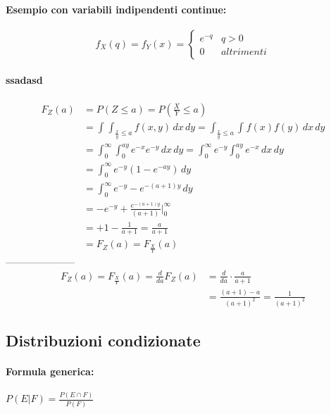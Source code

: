\documentclass[]{article}
\newcommand{\formula}{\paragraph{Formula generica:}}
\begin{document}
    \paragraph{Esempio con variabili indipendenti continue:}
    \begin{equation*}
        f_X(q) = f_Y(x) =
        \begin{cases}
            e^{-q} & q > 0 \\
            0 & altrimenti
        \end{cases}
    \end{equation*}

    \paragraph[short]{ssadasd}
    \begin{equation*}
    \begin{split}
        F_Z(a) & = P(Z \leq a) = P(\frac{X}{Y} \leq a) \\
        & = \int_{}^{} \int_{\frac{x}{y} \leq a}^{} f(x,y) \, dx \, dy = \int_{\frac{x}{y} \leq a}^{}\int_{}^{} f(x) f(y) \, dx \, dy \\ 
        & = \int_{0}^{\infty} \int_{0}^{ay} e^{-x} e^{-y} \, dx \, dy = \int_{0}^{\infty} e^{-y} \int_{0}^{ay} e^{-x} \, dx \, dy \\ 
        & = \int_{0}^{\infty} e^{-y}(1-e^{-ay}) \, dy \\
        & = \int_{0}^{\infty} e^{-y} -e^{-(a+1)y} \, dy \\ 
        & = -e^{-y} + \frac{e^{-(a+1)y}}{(a+1)} \bigg\rvert_{0}^{\infty} \\ 
        & = + 1 - \frac{1}{a+1} = \frac{a}{a+1} \\
        & = F_Z(a) = F_\frac{X}{Y}(a)
    \end{split}
    \end{equation*}
    ---------------------
    \begin{equation*}
    \begin{split}
        F_Z(a) = F_{\frac{X}{Y}}(a) = \frac{d}{da} F_Z(a) & = \frac{d}{da} \cdot \frac{a}{a+1} \\ 
        & = \frac{(a+1) - a}{(a+1)^2} = \frac{1}{(a+1)^2} 
    \end{split}
    \end{equation*}

    \subsection{Distribuzioni condizionate}
    \formula $P(E|F) = \frac{P(E \cap F)}{P(F)}$
\end{document}
